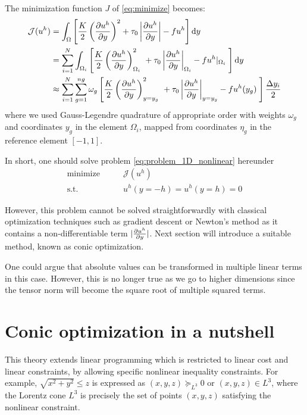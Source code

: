 \documentclass[11 pt]{report}
\begin{document}
The minimization function $J$ of \autoref{eq:minimize} becomes:
\begin{equation}
\begin{aligned}
    \mathcal{J}(u^h) &= \int_{\Omega} \left[ \frac{K}{2} \left(\pdv{u^h}{y}\right)^2 + \tau_0 \left|\pdv{u^h}{y}\right| - f u^h \right] \dd y\\
    &= \sum_{i=1}^N \int_{\Omega_i} \left[\frac{K}{2}  \left(\pdv{u^h}{y}\right)^2_{\Omega_i} \ + \tau_0 \left|\pdv{u^h}{y}\right|_{\Omega_i} - f u^h\vert_{\Omega_i} \; \right] \dd y\\
    &\approx \sum_{i=1}^N \sum_{g=1}^{ng} \omega_{g} \left[\frac{K}{2}  \left(\pdv{u^h}{y}\right)^2_{y=y_g} \ + \tau_0 \left|\pdv{u^h}{y}\right|_{y=y_g} - f u^h(y_g) \; \right] \frac{\Delta y_i}{2}
\end{aligned}
\end{equation}
where we used Gauss-Legendre quadrature of appropriate order with weights $\omega_g$ and coordinates $y_g$ in the element $\Omega_i$, mapped from coordinates $\eta_g$ in the reference element $[-1,1]$.

In short, one should solve problem \eqref{eq:problem_1D_nonlinear} hereunder
\begin{equation}
    \begin{aligned}
        \textrm{minimize} \qquad & \mathcal{J}(u^h)\\
        \textrm{s.t.} \qquad & u^h(y=-h) = u^h(y=h) = 0
    \end{aligned}\label{eq:problem_1D_nonlinear}
\end{equation}

However, this problem cannot be solved straightforwardly with classical optimization techniques such as gradient descent or Newton's method as it contains a non-differentiable term $|\pdv{u^h}{y}|$. Next section will introduce a suitable method, known as conic optimization.

One could argue that absolute values can be transformed in multiple linear terms in this case. However, this is no longer true as we go to higher dimensions since the tensor norm will become the square root of multiple squared terms. 

\section{Conic optimization in a nutshell}
This theory extends linear programming which is restricted to linear cost and linear constraints, by allowing specific nonlinear inequality constraints. For example, $\sqrt{x^2+y^2} \leq z$ is expressed as $(x,y,z) \succeq_{L^3} 0$ or $(x,y,z) \in L^3$, where the Lorentz cone $L^3$ is precisely the set of points $(x,y,z)$ satisfying the nonlinear constraint.
\end{document}
